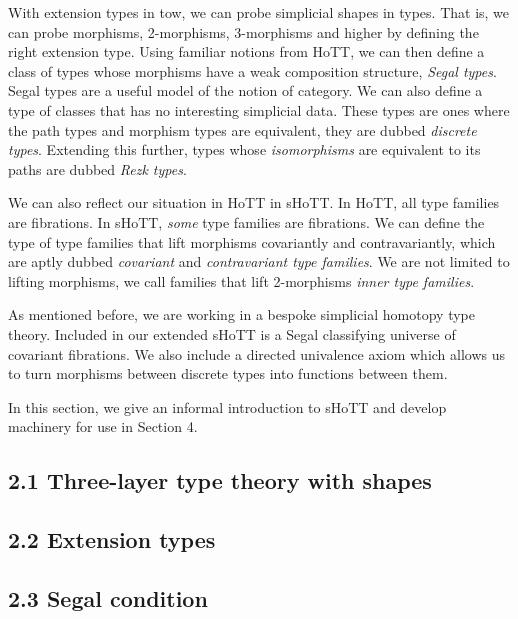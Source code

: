 \documentclass{article}
\theoremstyle{named}
\theoremstyle{remark}
\theoremstyle{definition}
\begin{document}
 With extension types in tow, we can probe simplicial shapes in types. That is, we can probe morphisms, 2-morphisms, 3-morphisms and higher by defining the right extension type. Using familiar notions from HoTT, we can then define a class of types whose morphisms have a weak composition structure, \textit{Segal types}. Segal types are a useful model of the notion of category. We can also define a type of classes that has no interesting simplicial data. These types are ones where the path types and morphism types are equivalent, they are dubbed \textit{discrete types}. Extending this further, types whose \textit{isomorphisms} are equivalent to its paths are dubbed \textit{Rezk types}. 


We can also reflect our situation in HoTT in sHoTT. In HoTT, all type families are fibrations. In sHoTT, \textit{some} type families are fibrations. We can define the type of type families that lift morphisms covariantly and contravariantly, which are aptly dubbed \textit{covariant} and \textit{contravariant type families}. We are not limited to lifting morphisms, we call families that lift 2-morphisms \textit{inner type families}. 

As mentioned before, we are working in a bespoke simplicial homotopy type theory. Included in our extended sHoTT is a Segal classifying universe of covariant fibrations. We also include a directed univalence axiom which allows us to turn morphisms between discrete types into functions between them. 

In this section, we give an informal introduction to sHoTT and develop machinery for use in Section 4.
\subsection*{2.1 Three-layer type theory with shapes}

\setcounter{theorem}{0}


\subsection*{2.2 Extension types}

\setcounter{theorem}{0}


\subsection*{2.3 Segal condition}

\setcounter{theorem}{0}
\end{document}
